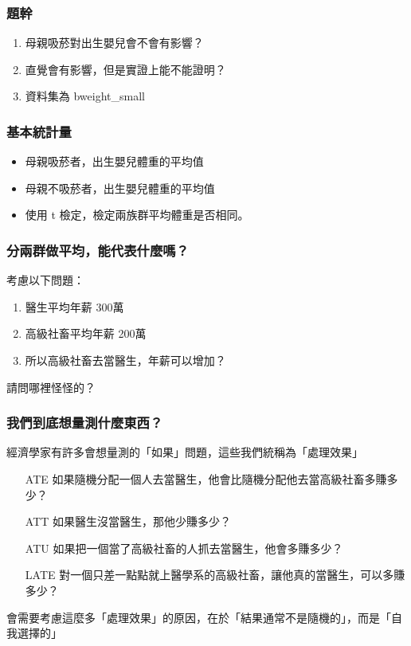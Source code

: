 \begin{frame}
    \frametitle{題幹}
    \begin{enumerate}
        \item 母親吸菸對出生嬰兒會不會有影響？
        \item 直覺會有影響，但是實證上能不能證明？
        \item 資料集為 bweight\_small
    \end{enumerate}
\end{frame}

\begin{frame}
    \frametitle{基本統計量}
    \begin{itemize}
        \item 母親吸菸者，出生嬰兒體重的平均值
        \item 母親不吸菸者，出生嬰兒體重的平均值
        \item 使用 t 檢定，檢定兩族群平均體重是否相同。
    \end{itemize}
\end{frame}

\begin{frame}
    \frametitle{分兩群做平均，能代表什麼嗎？}

    考慮以下問題：

    \begin{enumerate}
        \item 醫生平均年薪 300萬
        \item 高級社畜平均年薪 200萬
        \item 所以高級社畜去當醫生，年薪可以增加？
    \end{enumerate}
    \vfill
    請問哪裡怪怪的？

\end{frame}

\begin{frame}
    \frametitle{我們到底想量測什麼東西？}

    經濟學家有許多會想量測的「如果」問題，這些我們統稱為「處理效果」
    \begin{enumerate}
        \item[ATE] 如果隨機分配一個人去當醫生，他會比隨機分配他去當高級社畜多賺多少？
        \item[ATT] 如果醫生沒當醫生，那他少賺多少？
        \item[ATU] 如果把一個當了高級社畜的人抓去當醫生，他會多賺多少？
        \item[LATE] 對一個只差一點點就上醫學系的高級社畜，讓他真的當醫生，可以多賺多少？
    \end{enumerate}
    
    會需要考慮這麼多「處理效果」的原因，在於「結果通常不是隨機的」，而是「自我選擇的」
\end{frame}

